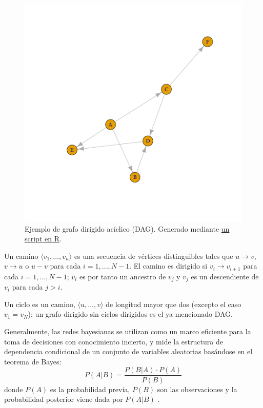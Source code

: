 \begin{figure}[h!]
    \centering
     \includegraphics[width=\textwidth]{./img/dag.png}
     \caption{Ejemplo de grafo dirigido acíclico (DAG). Generado mediante \href{https://github.com/ElenaMerelo/TFG/blob/master/scripts/dag.R}{un script en R}.}
     \label{img:dag1}
\end{figure}

Un camino $ \langle v_{1},...,v_{n} \rangle $ 
es una secuencia de vértices distinguibles tales que $u \rightarrow v$, $v \rightarrow u$ o $u - v$ para 
cada $i= 1,..., N-1$. El camino es dirigido si $v_{i} \rightarrow v_{i+1}$ 
para cada $i= 1,..., N-1$; $v_{i}$ es por tanto un ancestro de $v_{j}$ y $v_{j}$ es un descendiente de 
$v_{i}$ para cada $j > i$. 

Un ciclo es un camino, $\langle u,...,v \rangle$ de longitud mayor que dos 
(excepto el caso $v_{1} = v_{N}$); un grafo 
dirigido sin ciclos dirigidos es el ya mencionado DAG. 

Generalmente, las redes bayesianas se utilizan como un marco eficiente para la
toma de decisiones con conocimiento incierto, y mide la estructura de dependencia condicional
de un conjunto de variables aleatorias basándose en el teorema de Bayes:\\
\begin{equation} \label{eq:bayes}
P(A|B) = \frac{P(B|A) \cdot P(A)}{P(B)}
\end{equation}
donde $P(A)$ es la probabilidad previa, $P(B)$ son las observaciones y la probabilidad posterior viene dada 
por $P(A|B)$ \cite{YANG201919}.

